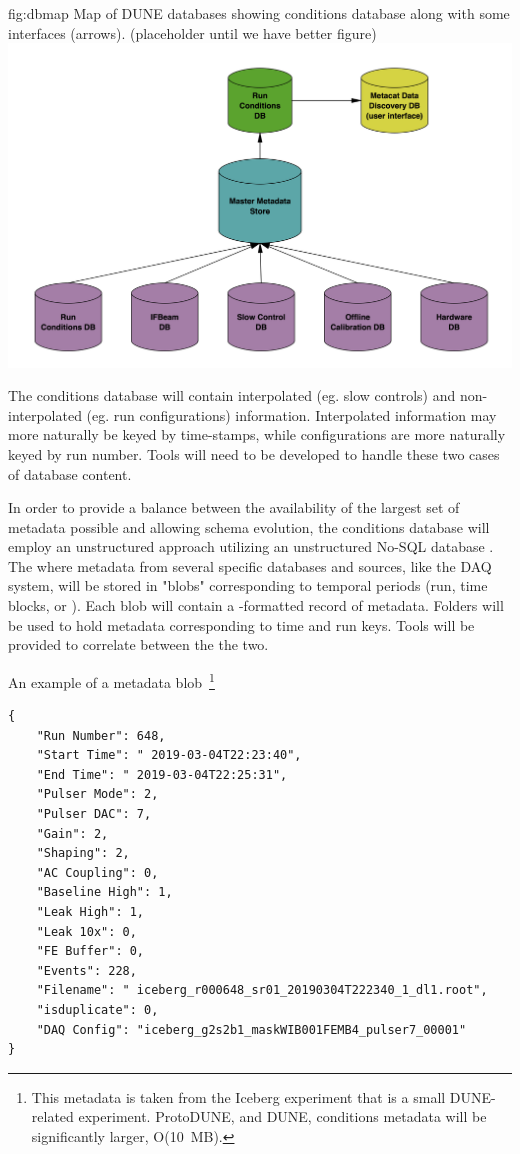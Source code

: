 \documentclass[../main-v1.tex]{subfiles}
\begin{document}
\begin{dunefigure}
{fig:dbmap} 
{Map of DUNE databases showing conditions database along with some interfaces (arrows). (placeholder until we have better figure)}
\includegraphics[width=.9\columnwidth]{graphics/Databases/DBSystem-cartoon.png}
\end{dunefigure}


The conditions database will contain interpolated (eg. slow controls) and non-interpolated (eg. run configurations) information. Interpolated information may more naturally be keyed by time-stamps, while configurations are more naturally keyed by run number. Tools will need to be developed to handle these two cases of database content. 

In order to provide a balance between the availability of the largest set of metadata possible  and allowing schema evolution,  the conditions database will employ an unstructured approach utilizing an unstructured No-SQL database \cite{bib:ucondb}. The  where metadata from several specific databases and sources, like the DAQ system, will be stored in "blobs" corresponding to temporal periods (run, time blocks, or ). Each blob will contain a -formatted record of metadata. Folders will be used to hold metadata corresponding to time and run keys. Tools will be provided to correlate between the the two. 

An example of a metadata blob~\footnote{This metadata is taken from the Iceberg experiment that is a small DUNE-related experiment. ProtoDUNE, and DUNE, conditions metadata will be significantly larger, O(10~MB).}

\begin{verbatim}
{
    "Run Number": 648,
    "Start Time": " 2019-03-04T22:23:40",
    "End Time": " 2019-03-04T22:25:31",
    "Pulser Mode": 2,
    "Pulser DAC": 7,
    "Gain": 2,
    "Shaping": 2,
    "AC Coupling": 0,
    "Baseline High": 1,
    "Leak High": 1,
    "Leak 10x": 0,
    "FE Buffer": 0,
    "Events": 228,
    "Filename": " iceberg_r000648_sr01_20190304T222340_1_dl1.root",
    "isduplicate": 0,
    "DAQ Config": "iceberg_g2s2b1_maskWIB001FEMB4_pulser7_00001"
}
\end{verbatim}
\end{document}
